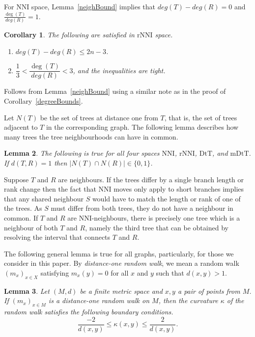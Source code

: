 \documentclass{amsart}
\newtheorem{lemma}{Lemma}
\newtheorem{corollary}[lemma]{Corollary}
\newcommand{\dts}{\mathrm{DtT}}
\newcommand{\nni}{\mathrm{NNI}}
\newcommand{\rnni}{\mathrm{rNNI}}
\newcommand{\mdts}{\mathrm{mDtT}}
\begin{document}
For $\nni$ space, Lemma~\ref{neighBound} implies that $deg(T)-deg(R) = 0$ and $\frac{\deg(T)}{deg(R)} = 1$.

\begin{corollary}\label{degreeBoundsNNI}
The following are satisfied in $\rnni$ space.
\begin{enumerate}[(1)]
\item $deg(T)-deg(R) \leq 2n-3$.
\item $\dfrac13 < \dfrac{\deg(T)}{deg(R)} < 3$, and the inequalities are tight.
\end{enumerate}
\end{corollary}

\proof
Follows from Lemma~\ref{neighBound} using a similar note as in the proof of Corollary~\ref{degreeBounds}.
\endproof

Let $N(T)$ be the set of trees at distance one from $T$, that is, the set of trees adjacent to $T$ in the corresponding graph.
The following lemma describes how many trees the tree neighbourhoods can have in common.

\begin{lemma}\label{intersecNeighb}
The following is true for all four spaces $\nni$, $\rnni$, $\dts$, and $\mdts$.
If $d(T,R) = 1$ then $|N(T)\cap N(R)|\in\{0,1\}$.
\end{lemma}

\proof
Suppose $T$ and $R$ are neighbours.
If the trees differ by a single branch length or rank change then the fact that NNI moves only apply to short branches implies that any shared neighbour $S$ would have to match the length or rank of one of the trees. As $S$ must differ from both trees, they do not have a neighbour in common.
If $T$ and $R$ are NNI-neighbours, there is precisely one tree which is a neighbour of both $T$ and $R$, namely the third tree that can be obtained by resolving the interval that connects $T$ and $R$.
\endproof

The following general lemma is true for all graphs, particularly, for those we consider in this paper.
By {\em distance-one random walk}, we mean a random walk $(m_x)_{x \in X}$ satisfying $m_x(y) = 0$ for all $x$ and $y$ such that $d(x,y) > 1$.

\begin{lemma}\label{curvBoundGeneral}
Let $(M,d)$ be a finite metric space and $x,y$ a pair of points from $M$. If
$(m_x)_{x \in M}$ is a distance-one random walk on $M$, then the curvature
$\kappa$ of the random walk satisfies the following boundary conditions.
\[
\dfrac{-2}{d(x,y)} \leq \kappa(x,y) \leq \dfrac{2}{d(x,y)}.
\]
\end{lemma}
\end{document}
